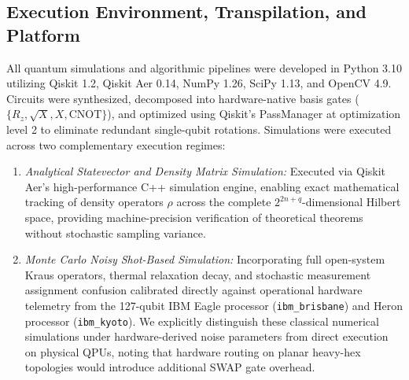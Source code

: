 \documentclass[12pt,onecolumn,draftclsnofoot]{IEEEtran}
\begin{document}
\subsection{Execution Environment, Transpilation, and Platform}
All quantum simulations and algorithmic pipelines were developed in Python 3.10 utilizing Qiskit 1.2, Qiskit Aer 0.14, NumPy 1.26, SciPy 1.13, and OpenCV 4.9. Circuits were synthesized, decomposed into hardware-native basis gates ($\{R_z, \sqrt{X}, X, \text{CNOT}\}$), and optimized using Qiskit's PassManager at optimization level 2 to eliminate redundant single-qubit rotations. Simulations were executed across two complementary execution regimes:
\begin{enumerate}
    \item \textit{Analytical Statevector and Density Matrix Simulation:} Executed via Qiskit Aer's high-performance C++ simulation engine, enabling exact mathematical tracking of density operators $\rho$ across the complete $2^{2n+q}$-dimensional Hilbert space, providing machine-precision verification of theoretical theorems without stochastic sampling variance.
    \item \textit{Monte Carlo Noisy Shot-Based Simulation:} Incorporating full open-system Kraus operators, thermal relaxation decay, and stochastic measurement assignment confusion calibrated directly against operational hardware telemetry from the 127-qubit IBM Eagle processor (\texttt{ibm\_brisbane}) and Heron processor (\texttt{ibm\_kyoto}). We explicitly distinguish these classical numerical simulations under hardware-derived noise parameters from direct execution on physical QPUs, noting that hardware routing on planar heavy-hex topologies would introduce additional SWAP gate overhead.
\end{enumerate}
\end{document}
